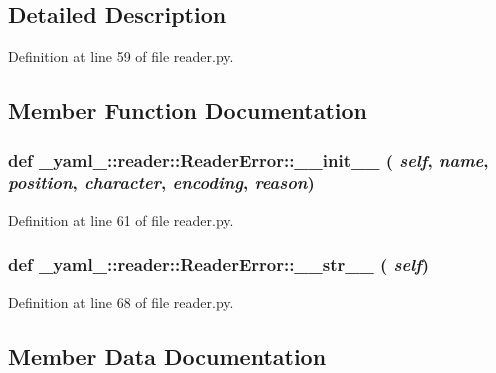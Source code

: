 \subsection{Detailed Description}


Definition at line 59 of file reader.py.

\subsection{Member Function Documentation}
\subsubsection{\setlength{\rightskip}{0pt plus 5cm}def \_\-yaml\_\-::reader::ReaderError::\_\-\_\-init\_\-\_\- ( {\em self},  {\em name},  {\em position},  {\em character},  {\em encoding},  {\em reason})}\label{class__yaml___1_1reader_1_1ReaderError_fe6a21aa225ff378e9bef3ccaf0d8889}




Definition at line 61 of file reader.py.
\subsubsection{\setlength{\rightskip}{0pt plus 5cm}def \_\-yaml\_\-::reader::ReaderError::\_\-\_\-str\_\-\_\- ( {\em self})}\label{class__yaml___1_1reader_1_1ReaderError_7cf6fa8857ab8cff3da440d52af663a5}




Definition at line 68 of file reader.py.

\subsection{Member Data Documentation}
\subsubsection{}\label{class__yaml___1_1reader_1_1ReaderError_ebf485513c9f0fc822cefabd090c778c}




